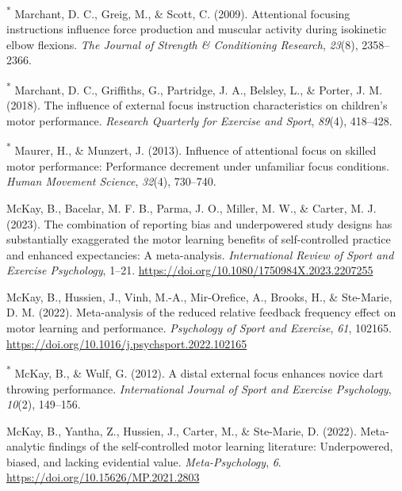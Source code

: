 \documentclass[
  man, donotrepeattitle,floatsintext]{apa7}
\newlength{\cslhangindent}
\newlength{\cslentryspacingunit} %
\newenvironment{CSLReferences}[2] %
 {%
  \setlength{\parindent}{0pt}
  \ifodd #1
  \let\oldpar\par
  \def\par{\hangindent=\cslhangindent\oldpar}
  \fi
  \setlength{\parskip}{#2\cslentryspacingunit}
 }%
 {}
\begin{document}
\begin{CSLReferences}{1}{0}
\leavevmode{}%
\textsuperscript{*} Marchant, D. C., Greig, M., \& Scott, C. (2009). Attentional focusing instructions influence force production and muscular activity during isokinetic elbow flexions. \emph{The Journal of Strength \& Conditioning Research}, \emph{23}(8), 2358--2366.

\leavevmode{}%
\textsuperscript{*} Marchant, D. C., Griffiths, G., Partridge, J. A., Belsley, L., \& Porter, J. M. (2018). The influence of external focus instruction characteristics on children's motor performance. \emph{Research Quarterly for Exercise and Sport}, \emph{89}(4), 418--428.

\leavevmode{}%
\textsuperscript{*} Maurer, H., \& Munzert, J. (2013). Influence of attentional focus on skilled motor performance: Performance decrement under unfamiliar focus conditions. \emph{Human Movement Science}, \emph{32}(4), 730--740.

\leavevmode{}%
McKay, B., Bacelar, M. F. B., Parma, J. O., Miller, M. W., \& Carter, M. J. (2023). The combination of reporting bias and underpowered study designs has substantially exaggerated the motor learning benefits of self-controlled practice and enhanced expectancies: A meta-analysis. \emph{International Review of Sport and Exercise Psychology}, 1--21. \url{https://doi.org/10.1080/1750984X.2023.2207255}

\leavevmode{}%
McKay, B., Hussien, J., Vinh, M.-A., Mir-Orefice, A., Brooks, H., \& Ste-Marie, D. M. (2022). Meta-analysis of the reduced relative feedback frequency effect on motor learning and performance. \emph{Psychology of Sport and Exercise}, \emph{61}, 102165. \url{https://doi.org/10.1016/j.psychsport.2022.102165}

\leavevmode{}%
\textsuperscript{*} McKay, B., \& Wulf, G. (2012). A distal external focus enhances novice dart throwing performance. \emph{International Journal of Sport and Exercise Psychology}, \emph{10}(2), 149--156.

\leavevmode{}%
McKay, B., Yantha, Z., Hussien, J., Carter, M., \& Ste-Marie, D. (2022). Meta-analytic findings of the self-controlled motor learning literature: {Underpowered}, biased, and lacking evidential value. \emph{Meta-Psychology}, \emph{6}. \url{https://doi.org/10.15626/MP.2021.2803}


\end{CSLReferences}
\end{document}
